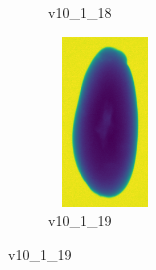 \documentclass[11pt]{article}
\begin{document}
\begin{figure}
\begin{subfigure}[b]{0.15\textwidth}
        \caption{v10\_1\_18}
         \label{fig:five over x}
     \end{subfigure}
     \hfill
    \begin{subfigure}[b]{0.15\textwidth}
         \centering
         \includegraphics[width=3cm, height=4.5cm]{images/kartofler/v10_1_19_cut.png}
        \caption{v10\_1\_19}
         \label{fig:five over x}
     \end{subfigure}
\end{figure}




\newpage
\end{document}
